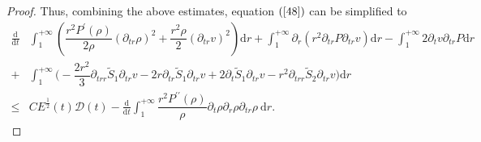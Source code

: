 \documentclass[10pt,reqno]{amsart}
\numberwithin{equation}{section}
\begin{document}
\begin{proof}
		Thus, combining the above estimates, equation $(\ref{48})$ can be simplified to
		\begin{align}\label{49}
				\frac{\mathrm{d}}{\mathrm{d} t}&\int_{1}^{+\infty}\left(\dfrac{r^2 P^{\prime}(\rho)}{2\rho} \left(\partial_{tr} \rho\right)^2+\dfrac{r^2\rho}{2} (\partial_{tr}v)^2\right)\mathrm{d}r
				+\int_{1}^{+\infty}\partial_{r}\left(r^2\partial_{tr}P\partial_{tr}v\right)\mathrm{d}r
				-\int_{1}^{+\infty}2\partial_{t}v\partial_{tr}P\mathrm{d}r\nonumber \\
				+&\int_{1}^{+\infty}\bigg(-\dfrac{2 r^2}{3}\partial_{trr}\tilde{S}_1 \partial_{tr}v-2r \partial_{tr}\tilde{S}_1 \partial_{tr}v+2\partial_{t}\tilde{S}_1 \partial_{tr}v
				-r^2 \partial_{trr}\tilde{S}_2 \partial_{tr}v\bigg)\mathrm{d}r
				\nonumber \\
				\leq& C E^{\frac{1}{2}}(t) \mathcal{D}(t)
				-\frac{\mathrm{d}}{\mathrm{d} t}\int_{1}^{+\infty} \dfrac{r^2 P^{\prime\prime}(\rho)}{\rho} \partial_{t}\rho\partial_{r}\rho\partial_{tr}\rho\mathrm{~d}r.
		\end{align}
		

\end{proof}
\end{document}
